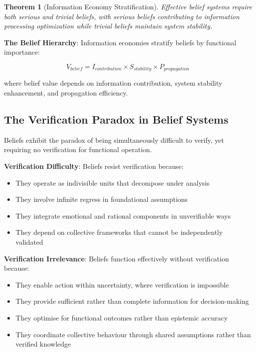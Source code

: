 \documentclass[12pt,a4paper]{article}
\newtheorem{theorem}{Theorem}
\begin{document}
\begin{theorem}[Information Economy Stratification]
Effective belief systems require both serious and trivial beliefs, with serious beliefs contributing to information processing optimization while trivial beliefs maintain system stability.
\end{theorem}

\textbf{The Belief Hierarchy}: Information economies stratify beliefs by functional importance:

\begin{equation}
V_{belief} = I_{contribution} \times S_{stability} \times P_{propagation}
\end{equation}

where belief value depends on information contribution, system stability enhancement, and propagation efficiency.

\subsection{The Verification Paradox in Belief Systems}

Beliefs exhibit the paradox of being simultaneously difficult to verify, yet requiring no verification for functional operation.

\textbf{Verification Difficulty}: Beliefs resist verification because:
\begin{itemize}
\item They operate as indivisible units that decompose under analysis
\item They involve infinite regress in foundational assumptions
\item They integrate emotional and rational components in unverifiable ways
\item They depend on collective frameworks that cannot be independently validated
\end{itemize}

\textbf{Verification Irrelevance}: Beliefs function effectively without verification because:
\begin{itemize}
\item They enable action within uncertainty, where verification is impossible
\item They provide sufficient rather than complete information for decision-making
\item They optimise for functional outcomes rather than epistemic accuracy
\item They coordinate collective behaviour through shared assumptions rather than verified knowledge
\end{itemize}
\end{document}
